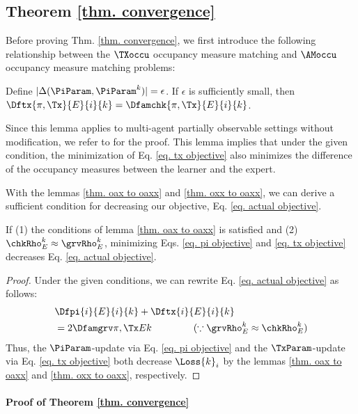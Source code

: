 \subsection{Theorem \ref{thm. convergence}}
Before proving Thm. \ref{thm. convergence},  we first introduce the following relationship between the $\TXoccu$ occupancy measure matching and $\AMoccu$ occupancy measure matching problems:
\begin{lemma}
\label{thm. oxx to oaxx}
    Define $|\Delta(\PiParam, \PiParam^k)|=\epsilon$. If $\epsilon$ is sufficiently small, then $\Dftx{\pi, \Tx}{E}{i}{k}=\Dfamchk{\pi, \Tx}{E}{i}{k}$.
\end{lemma}
Since this lemma applies to multi-agent partially observable settings without modification, we refer to \cite{seo2024idil} for the proof. This lemma implies that under the given condition, the minimization of Eq. \ref{eq. tx objective} also minimizes the difference of the \AMoccu occupancy measures between the learner and the expert.

With the lemmas \ref{thm. oax to oaxx} and \ref{thm. oxx to oaxx}, we can derive a sufficient condition for decreasing our objective, Eq. \ref{eq. actual objective}.
\begin{corollary}
    If (1) the conditions of lemma \ref{thm. oax to oaxx} is satisfied and (2) $\chkRho_E^k\approx\grvRho_E^k$, minimizing Eqs. \ref{eq. pi objective} and \ref{eq. tx objective} decreases Eq. \ref{eq. actual objective}.
\end{corollary}
\begin{proof}
    Under the given conditions, we can rewrite Eq. \ref{eq. actual objective} as follows:
    \begin{align*}
        &\Dfpi{i}{E}{i}{k} +  \Dftx{i}{E}{i}{k} \\
        &= 2\Dfamlemma{} \hspace{10ex} (\because \grvRho_E^k \approx \chkRho_E^k)
    \end{align*}
    Thus, the $\PiParam$-update via Eq. \ref{eq. pi objective} and the $\TxParam$-update via Eq. \ref{eq. tx objective} both decrease $\Loss{k}_i$ by the lemmas \ref{thm. oax to oaxx} and \ref{thm. oxx to oaxx}, respectively.
\end{proof}



\paragraph{Proof of Theorem \ref{thm. convergence}}

